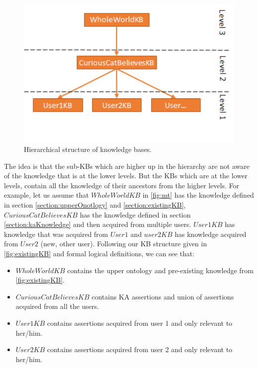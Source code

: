 \begin{figure}[H]
	\centering
		\includegraphics[width=1\textwidth]{figures/microtheories.png}
	\caption{Hierarchical structure of knowledge bases.}
	\label{fig:mt}
\end{figure}

The idea is that the sub-KBs which are higher up in the hierarchy are not aware
of the knowledge that is at the lower levels. But the KBs which are at the lower
levels, contain all the knowledge of their ancestors from the higher levels. 
For example,  let us assume that $WholeWorldKB$  in \autoref{fig:mt} has the 
knowledge defined in section \ref{section:upperOnotlogy} and 
\autoref{section:existingKB}, $CuriousCatBelievesKB$ has the knowledge defined
in section \autoref{section:kaKnowledge} and then acquired from multiple users. 
$User1KB$ has knowledge that was acquired from $User1$ and $user2KB$ has 
knowledge acquired from $User2$ (new, other user). Following our KB structure 
given in \autoref{fig:existingKB} and formal logical definitions, 
we can see that:
\begin{itemize}
\item $WholeWorldKB$ contains the upper ontology and pre-existing knowledge 
from \autoref{fig:existingKB}.
\item $CuriousCatBelievesKB$ contains KA assertions and union of assertions 
acquired from all the users.
\item $User1KB$ contains assertions acquired from user 1 and only relevant to 
her/him.
\item $User2KB$ contains assertions acquired from user 2 and only relevant to 
her/him.
\end{itemize}

